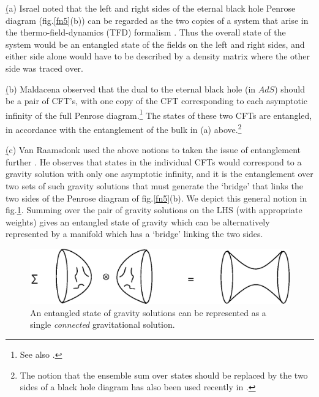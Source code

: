 \documentclass[11pt]{article}
\begin{document}
\b


(a) Israel \cite{israel2} noted that the left and right sides of the eternal black hole Penrose diagram (fig.\ref{fn5}(b)) can be regarded as the two copies of a system that arise in the thermo-field-dynamics (TFD) formalism \cite{umezawa}. Thus the overall state of the system would be an entangled state of the fields on the left and right sides, and either side alone would have to be described by a density matrix where the other side was traced over.

\b

(b) Maldacena \cite{maldacena2} observed that the dual to the eternal black hole (in $AdS$) should be a pair of CFT's, with one copy of the CFT corresponding to each asymptotic infinity of the full Penrose diagram.\footnote{See also \cite{horowitzmarolf,trivedi}.} The states of these two CFTs are entangled, in accordance with the entanglement of the  bulk in (a) above.\footnote{The notion that the ensemble sum over states should be replaced by the two sides of a black hole diagram has also been used recently in \cite{sen}.} 

\b

(c) Van Raamsdonk used the above notions to  taken the issue of entanglement further \cite{raamsdonk}. He observes that states in the individual CFTs would correspond to a gravity solution with only one asymptotic infinity, and it is the entanglement over two sets of such gravity solutions that must generate the `bridge' that links the two sides of the Penrose diagram of fig.\ref{fn5}(b). We depict this general notion in fig.\ref{fn6}. Summing over the pair of gravity solutions on the LHS (with appropriate weights) gives an entangled state of gravity which can be alternatively represented by a manifold which has a `bridge' linking the two sides.

\begin{figure}[htbp]
\begin{center}
\includegraphics[scale=.85]{fn6.eps}
\caption{{An entangled state of gravity solutions can be represented as a single {\it connected} gravitational solution.}}
\label{fn6}
\end{center}
\end{figure}
\end{document}
